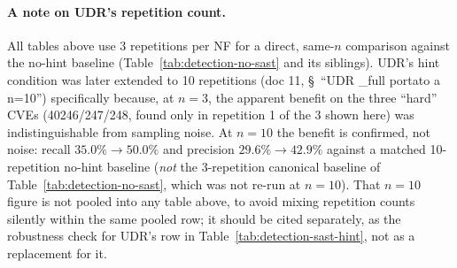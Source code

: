 
\paragraph{A note on UDR's repetition count.} All tables above use 3
repetitions per NF for a direct, same-$n$ comparison against the no-hint
baseline (Table~\ref{tab:detection-no-sast} and its siblings). UDR's hint
condition was later extended to 10 repetitions (doc 11,
\S~``UDR \_full portato a n=10'') specifically because, at $n=3$, the
apparent benefit on the three ``hard'' CVEs (40246/247/248, found only in
repetition 1 of the 3 shown here) was indistinguishable from sampling
noise. At $n=10$ the benefit is confirmed, not noise: recall
$35.0\%\to50.0\%$ and precision $29.6\%\to42.9\%$ against a matched
10-repetition no-hint baseline (\emph{not} the 3-repetition canonical
baseline of Table~\ref{tab:detection-no-sast}, which was not re-run at
$n=10$). That $n=10$ figure is not pooled into any table above, to avoid
mixing repetition counts silently within the same pooled row; it should
be cited separately, as the robustness check for UDR's row in
Table~\ref{tab:detection-sast-hint}, not as a replacement for it.

